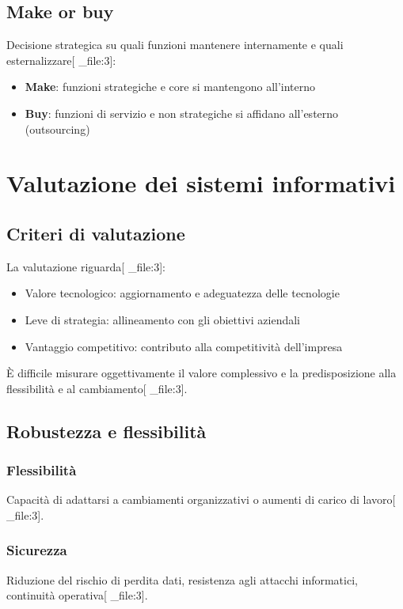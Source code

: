 \documentclass[12pt,a4paper]{article}
\begin{document}
\subsection{Make or buy}
Decisione strategica su quali funzioni mantenere internamente e quali esternalizzare[ _file:3]:
\begin{itemize}
    \item \textbf{Make}: funzioni strategiche e core si mantengono all'interno
    \item \textbf{Buy}: funzioni di servizio e non strategiche si affidano all'esterno (outsourcing)
\end{itemize}

\section{Valutazione dei sistemi informativi}

\subsection{Criteri di valutazione}
La valutazione riguarda[ _file:3]:
\begin{itemize}
    \item Valore tecnologico: aggiornamento e adeguatezza delle tecnologie
    \item Leve di strategia: allineamento con gli obiettivi aziendali
    \item Vantaggio competitivo: contributo alla competitività dell'impresa
\end{itemize}

È difficile misurare oggettivamente il valore complessivo e la predisposizione alla flessibilità e al cambiamento[ _file:3].

\subsection{Robustezza e flessibilità}

\subsubsection{Flessibilità}
Capacità di adattarsi a cambiamenti organizzativi o aumenti di carico di lavoro[ _file:3].

\subsubsection{Sicurezza}
Riduzione del rischio di perdita dati, resistenza agli attacchi informatici, continuità operativa[ _file:3].
\end{document}

